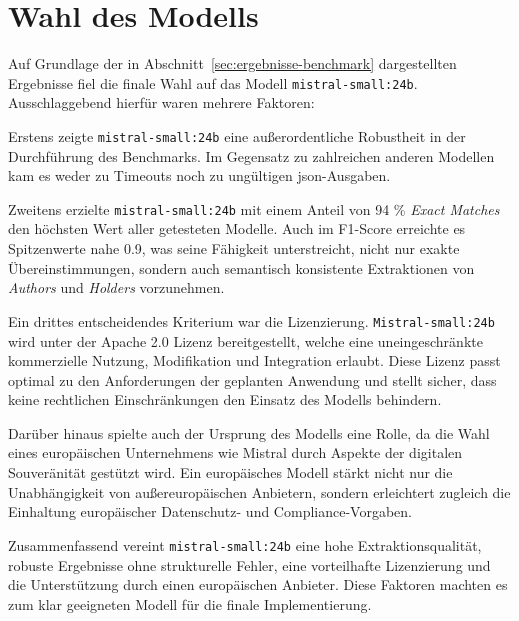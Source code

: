 
\section{Wahl des Modells}\label{sec:auswahl-modell-benchmark}

Auf Grundlage der in Abschnitt~\ref{sec:ergebnisse-benchmark} dargestellten Ergebnisse fiel die finale Wahl auf das Modell \texttt{mistral-small:24b}.
Ausschlaggebend hierfür waren mehrere Faktoren:

Erstens zeigte \texttt{mistral-small:24b} eine außerordentliche Robustheit in der Durchführung des Benchmarks.
Im Gegensatz zu zahlreichen anderen Modellen kam es weder zu Timeouts noch zu ungültigen \gls{json}-Ausgaben.

Zweitens erzielte \texttt{mistral-small:24b} mit einem Anteil von \num{94} \% \textit{Exact Matches} den höchsten Wert aller getesteten Modelle.
Auch im F1-Score erreichte es Spitzenwerte nahe \num{0.9}, was seine Fähigkeit unterstreicht, nicht nur exakte Übereinstimmungen, sondern auch semantisch konsistente Extraktionen von \textit{Authors} und \textit{Holders} vorzunehmen.

Ein drittes entscheidendes Kriterium war die Lizenzierung.
\texttt{Mistral-small:24b} wird unter der Apache 2.0 Lizenz bereitgestellt, welche eine uneingeschränkte kommerzielle Nutzung, Modifikation und Integration erlaubt.
Diese Lizenz passt optimal zu den Anforderungen der geplanten Anwendung und stellt sicher, dass keine rechtlichen Einschränkungen den Einsatz des Modells behindern.

Darüber hinaus spielte auch der Ursprung des Modells eine Rolle, da die Wahl eines europäischen Unternehmens wie Mistral durch Aspekte der digitalen Souveränität gestützt wird.
Ein europäisches Modell stärkt nicht nur die Unabhängigkeit von außereuropäischen Anbietern, sondern erleichtert zugleich die Einhaltung europäischer Datenschutz- und Compliance-Vorgaben.

Zusammenfassend vereint \texttt{mistral-small:24b} eine hohe Extraktionsqualität, robuste Ergebnisse ohne strukturelle Fehler, eine vorteilhafte Lizenzierung und die Unterstützung durch einen europäischen Anbieter.
Diese Faktoren machten es zum klar geeigneten Modell für die finale Implementierung.
